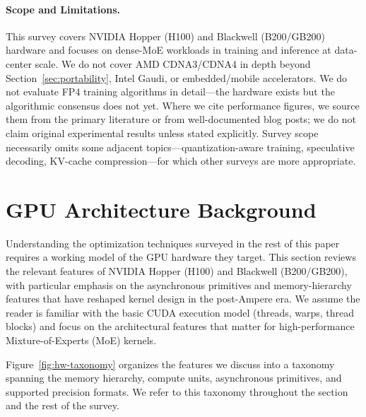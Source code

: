\documentclass[10pt]{article}
\begin{document}
\paragraph{Scope and Limitations.} This survey covers NVIDIA Hopper (H100) and Blackwell (B200/GB200) hardware and focuses on dense-MoE workloads in training and inference at data-center scale. We do not cover AMD CDNA3/CDNA4 in depth beyond Section~\ref{sec:portability}, Intel Gaudi, or embedded/mobile accelerators. We do not evaluate FP4 training algorithms in detail---the hardware exists but the algorithmic consensus does not yet. Where we cite performance figures, we source them from the primary literature or from well-documented blog posts; we do not claim original experimental results unless stated explicitly. Survey scope necessarily omits some adjacent topics---quantization-aware training, speculative decoding, KV-cache compression---for which other surveys are more appropriate.


\section{GPU Architecture Background}
\label{sec:hardware}

Understanding the optimization techniques surveyed in the rest of this paper requires a working model of the GPU hardware they target. This section reviews the relevant features of NVIDIA Hopper (H100) and Blackwell (B200/GB200), with particular emphasis on the asynchronous primitives and memory-hierarchy features that have reshaped kernel design in the post-Ampere era. We assume the reader is familiar with the basic CUDA execution model (threads, warps, thread blocks) and focus on the architectural features that matter for high-performance Mixture-of-Experts (MoE) kernels.

Figure~\ref{fig:hw-taxonomy} organizes the features we discuss into a taxonomy spanning the memory hierarchy, compute units, asynchronous primitives, and supported precision formats. We refer to this taxonomy throughout the section and the rest of the survey.
\end{document}
